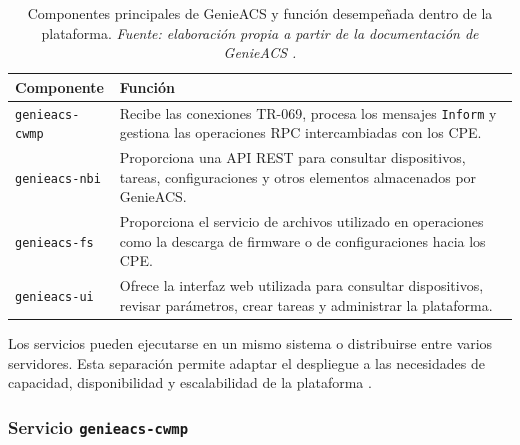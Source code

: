 \begin{table}[H]
    \centering
    \small
    \renewcommand{\arraystretch}{1.35}

    \caption[Componentes principales de GenieACS.]
    {Componentes principales de GenieACS y función desempeñada dentro de
    la plataforma.
    \textit{Fuente: elaboración propia a partir de la documentación de
    GenieACS \cite{genieacs_documentation}.}}

    \label{tab:componentes-genieacs}

    \begin{tabular}{
        p{}
        p{}
    }
        \hline
        \textbf{Componente}
        &
        \textbf{Función}
        \\
        \hline

        \texttt{genieacs-cwmp}
        &
        Recibe las conexiones TR-069, procesa los mensajes
        \texttt{Inform} y gestiona las operaciones RPC intercambiadas con
        los CPE.
        \\

        \texttt{genieacs-nbi}
        &
        Proporciona una API REST para consultar dispositivos, tareas,
        configuraciones y otros elementos almacenados por GenieACS.
        \\

        \texttt{genieacs-fs}
        &
        Proporciona el servicio de archivos utilizado en operaciones como
        la descarga de firmware o de configuraciones hacia los CPE.
        \\

        \texttt{genieacs-ui}
        &
        Ofrece la interfaz web utilizada para consultar dispositivos,
        revisar parámetros, crear tareas y administrar la plataforma.
        \\

        \hline
    \end{tabular}
\end{table}

Los servicios pueden ejecutarse en un mismo sistema o distribuirse entre
varios servidores. Esta separación permite adaptar el despliegue a las
necesidades de capacidad, disponibilidad y escalabilidad de la
plataforma \cite{genieacs_documentation}.


\subsubsection*{Servicio \texttt{genieacs-cwmp}}

